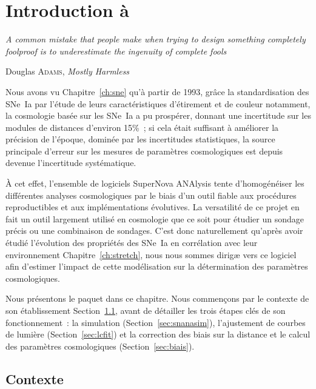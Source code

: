 \documentclass[../main/main.tex]{subfiles}
\begin{document}
\dominitoc
\faketableofcontents
\dominilof
\fakelistoffigures
\dominilot
\fakelistoftables

\chapter{Introduction \`a \snana}\label{ch:snana}
\epigraph{\openquote\textit{A common mistake that people make when trying to
design something completely foolproof is to underestimate the ingenuity of
complete fools}\closequote}{Douglas \textsc{Adams}, \textit{Mostly Harmless}}

Nous avons vu Chapitre~\ref{ch:sne} qu'à partir de 1993, grâce la
standardisation des SNe~Ia par l'étude de leurs caractéristiques d'étirement et
de couleur notamment, la cosmologie basée sur les SNe~Ia a pu prospérer, donnant
une incertitude sur les modules de distances d'environ 15\%~; si cela était
suffisant à améliorer la précision de l'époque, dominée par les incertitudes
statistiques, la source principale d'erreur sur les mesures de paramètres
cosmologiques est depuis devenue l'incertitude systématique.

À cet effet, l'ensemble de logiciels SuperNova ANAlysis
\citep[\snana,][]{kessler2009a} tente d'homogénéiser les différentes analyses
cosmologiques par le biais d'un outil fiable aux procédures reproductibles et
aux implémentations évolutives. La versatilité de ce projet en fait un outil
largement utilisé en cosmologie \citep[par exemple,][]{kessler2009b, conley2011,
betoule2014, smith2020} que ce soit pour étudier un sondage précis ou une
combinaison de sondages. C'est donc naturellement qu'après avoir étudié
l'évolution des propriétés des SNe~Ia en corrélation avec leur environnement
Chapitre~\ref{ch:stretch}, nous nous sommes dirigæ vers ce logiciel afin
d'estimer l'impact de cette modélisation sur la détermination des paramètres
cosmologiques.

Nous présentons le paquet dans ce chapitre. Nous commençons par le contexte de
son établissement Section~\ref{sec:snanacont}, avant de détailler les trois
étapes clés de son fonctionnement~: la simulation (Section~\ref{sec:snanasim}),
l'ajustement de courbes de lumière (Section~\ref{sec:lcfit}) et la correction
des biais sur la distance et le calcul des paramètres cosmologiques
(Section~\ref{sec:biais}).

\vfill
\minitoc
\vfill

\newpage

\section{Contexte}\label{sec:snanacont}
\end{document}
